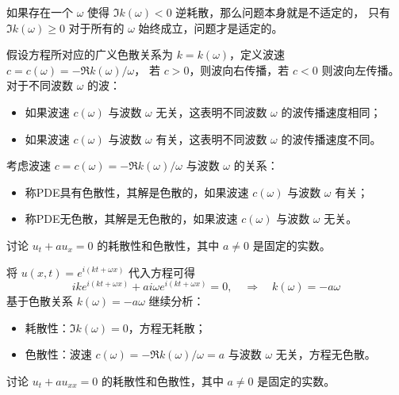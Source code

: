 \begin{remark}
    如果存在一个 $\omega$ 使得 $\Im k(\omega) < 0$ 逆耗散，那么问题本身就是不适定的，
    只有 $\Im k(\omega) \ge 0$ 对于所有的 $\omega$ 始终成立，问题才是适定的。
\end{remark}

假设方程所对应的广义色散关系为 $k=k(\omega)$，定义波速 $c = c(\omega) = - \Re k(\omega) / \omega$，
若 $c > 0$，则波向右传播，若 $c < 0$ 则波向左传播。
对于不同波数 $\omega$ 的波：
\begin{itemize}
    \item 如果波速 $c(\omega)$ 与波数 $\omega$ 无关，这表明不同波数 $\omega$ 的波传播速度相同；
    \item 如果波速 $c(\omega)$ 与波数 $\omega$ 有关，这表明不同波数 $\omega$ 的波传播速度不同。
\end{itemize}


\begin{definition}[方程的色散性]
    考虑波速 $c = c(\omega) = - \Re k(\omega) / \omega$ 与波数 $\omega$ 的关系：
    \begin{itemize}
        \item 称PDE具有色散性，其解是色散的，如果波速 $c(\omega)$ 与波数 $\omega$ 有关；
        \item 称PDE无色散，其解是无色散的，如果波速 $c(\omega)$ 与波数 $\omega$ 无关。
    \end{itemize}
\end{definition}


\begin{example}
    讨论 $u_t + a u_x = 0$ 的耗散性和色散性，其中 $a \neq 0$ 是固定的实数。
\end{example}

\begin{solution*}
    将 $u(x,t) = e^{i(k t+\omega x)}$ 代入方程可得
    \[
        i k e^{i(k t+\omega x)} + a i \omega e^{i(k t+\omega x)} = 0,
        \quad \Rightarrow \quad
        k(\omega) = - a \omega
    \]
    基于色散关系 $k(\omega) = - a \omega$ 继续分析：
    \begin{itemize}
        \item 耗散性：$\Im k(\omega) = 0$，方程无耗散；
        \item 色散性：波速 $c(\omega) = - \Re k(\omega) / \omega = a$ 与波数 $\omega$ 无关，方程无色散。
    \end{itemize}
\end{solution*}


\begin{example}
    讨论 $u_t + a u_{xx} = 0$ 的耗散性和色散性，其中 $a \neq 0$ 是固定的实数。
\end{example}

